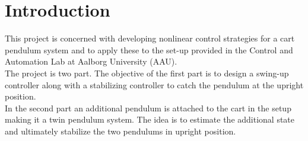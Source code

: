 \chapter{Introduction}\label{chap:introduction}
This project is concerned with developing nonlinear control strategies for a cart pendulum system and to apply these to the set-up provided in the Control and Automation Lab at Aalborg University (AAU).\\
The project is two part. The objective of the first part is to design a swing-up controller along with a stabilizing controller to catch the pendulum at the upright position.\\
In the second part an additional pendulum is attached to the cart in the setup making it a twin pendulum system. The idea is to estimate the additional state and ultimately stabilize the two pendulums in upright position.